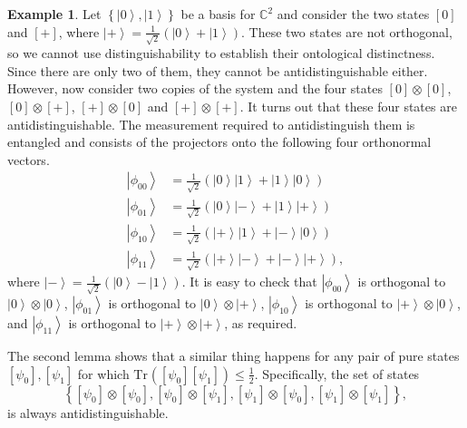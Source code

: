 \documentclass[DIV=calc,paper=a4,fontsize=11pt,twocolumn]{scrartcl} %
\theoremstyle{definition}
\newtheorem{example}[definition]{Example}
\theoremstyle{plain}
\newcommand{\Ket}[1]{\ensuremath{\left \vert #1 \right \rangle}}
\newcommand{\Proj}[1]{\ensuremath{\left [ #1 \right ]}}
\newcommand{\Tr}[2][]{\ensuremath{\text{Tr}_{#1} \left ( #2 \right )}}
\begin{document}
\begin{example}
\label{exa:Main:Pusey--Barrett--Rudolph}
Let $\left \{ \Ket{0}, \Ket{1} \right \}$ be a basis for
$\mathbb{C}^2$ and consider the two states $\Proj{0}$ and
$\Proj{+}$, where $\Ket{+} = \frac{1}{\sqrt{2}} \left ( \Ket{0} +
\Ket{1} \right )$.  These two states are not orthogonal, so we
cannot use distinguishability to establish their ontological
distinctness.  Since there are only two of them, they cannot be
antidistinguishable either.  However, now consider two copies of the
system and the four states $\Proj{0}\otimes \Proj{0}$, $\Proj{0}
\otimes \Proj{+}$, $\Proj{+} \otimes \Proj{0}$ and $\Proj{+} \otimes
\Proj{+}$.  It turns out that these four states are
antidistinguishable.  The measurement required to antidistinguish
them is entangled and consists of the projectors onto the following
four orthonormal vectors.
\begin{align}
\Ket{\phi_{00}} & = \frac{1}{\sqrt{2}} \left ( \Ket{0}
\Ket{1} + \Ket{1} \Ket{0} \right) \\
\Ket{\phi_{01}} & = \frac{1}{\sqrt{2}} \left ( \Ket{0}
\Ket{-} + \Ket{1} \Ket{+} \right) \\
\Ket{\phi_{10}} & = \frac{1}{\sqrt{2}} \left ( \Ket{+}
\Ket{1} + \Ket{-} \Ket{0} \right) \\
\Ket{\phi_{11}} & = \frac{1}{\sqrt{2}} \left ( \Ket{+}
\Ket{-} + \Ket{-} \Ket{+} \right),
\end{align}
where $\Ket{-} = \frac{1}{\sqrt{2}} \left ( \Ket{0} - \Ket{1}
\right )$.  It is easy to check that $\Ket{\phi_{00}}$ is orthogonal to
$\Ket{0}\otimes \Ket{0}$, $\Ket{\phi_{01}}$ is orthogonal to
$\Ket{0} \otimes \Ket{+}$, $\Ket{\phi_{10}}$ is orthogonal to
$\Ket{+} \otimes \Ket{0}$, and $\Ket{\phi_{11}}$ is orthogonal to
$\Ket{+} \otimes \Ket{+}$, as required.

The second lemma shows that a similar thing happens for any pair of
pure states $\Proj{\psi_0}, \Proj{\psi_1}$ for which
$\Tr{\Proj{\psi_0}\Proj{\psi_1}} \leq \frac{1}{2}$.  Specifically,
the set of states
\begin{equation}
\left \{ \Proj{\psi_{0}} \otimes \Proj{\psi_{0}}, \Proj{\psi_{0}}
\otimes \Proj{\psi_{1}}, \Proj{\psi_{1}} \otimes
\Proj{\psi_{0}}, \Proj{\psi_{1}} \otimes \Proj{\psi_{1}} \right
\},
\end{equation}
is always antidistinguishable.


\end{example}
\end{document}
